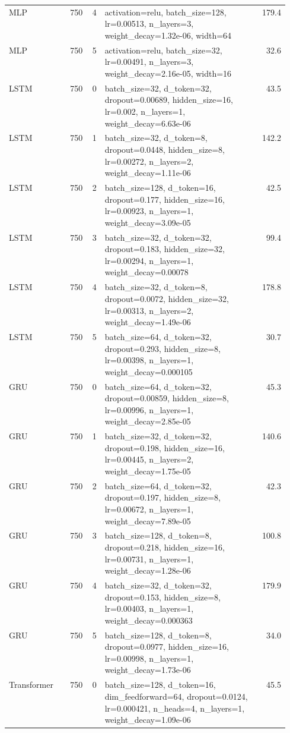 \begin{longtable}{lrrp{0.55\linewidth}r}
MLP & 750 & 4 & activation=relu, batch\_size=128, lr=0.00513, n\_layers=3, weight\_decay=1.32e-06, width=64 & 179.4 \\
MLP & 750 & 5 & activation=relu, batch\_size=32, lr=0.00491, n\_layers=3, weight\_decay=2.16e-05, width=16 & 32.6 \\
LSTM & 750 & 0 & batch\_size=32, d\_token=32, dropout=0.00689, hidden\_size=16, lr=0.002, n\_layers=1, weight\_decay=6.63e-06 & 43.5 \\
LSTM & 750 & 1 & batch\_size=32, d\_token=8, dropout=0.0448, hidden\_size=8, lr=0.00272, n\_layers=2, weight\_decay=1.11e-06 & 142.2 \\
LSTM & 750 & 2 & batch\_size=128, d\_token=16, dropout=0.177, hidden\_size=16, lr=0.00923, n\_layers=1, weight\_decay=3.09e-05 & 42.5 \\
LSTM & 750 & 3 & batch\_size=32, d\_token=32, dropout=0.183, hidden\_size=32, lr=0.00294, n\_layers=1, weight\_decay=0.00078 & 99.4 \\
LSTM & 750 & 4 & batch\_size=32, d\_token=8, dropout=0.0072, hidden\_size=32, lr=0.00313, n\_layers=2, weight\_decay=1.49e-06 & 178.8 \\
LSTM & 750 & 5 & batch\_size=64, d\_token=32, dropout=0.293, hidden\_size=8, lr=0.00398, n\_layers=1, weight\_decay=0.000105 & 30.7 \\
GRU & 750 & 0 & batch\_size=64, d\_token=32, dropout=0.00859, hidden\_size=8, lr=0.00996, n\_layers=1, weight\_decay=2.85e-05 & 45.3 \\
GRU & 750 & 1 & batch\_size=32, d\_token=32, dropout=0.198, hidden\_size=16, lr=0.00445, n\_layers=2, weight\_decay=1.75e-05 & 140.6 \\
GRU & 750 & 2 & batch\_size=64, d\_token=32, dropout=0.197, hidden\_size=8, lr=0.00672, n\_layers=1, weight\_decay=7.89e-05 & 42.3 \\
GRU & 750 & 3 & batch\_size=128, d\_token=8, dropout=0.218, hidden\_size=16, lr=0.00731, n\_layers=1, weight\_decay=1.28e-06 & 100.8 \\
GRU & 750 & 4 & batch\_size=32, d\_token=32, dropout=0.153, hidden\_size=8, lr=0.00403, n\_layers=1, weight\_decay=0.000363 & 179.9 \\
GRU & 750 & 5 & batch\_size=128, d\_token=8, dropout=0.0977, hidden\_size=16, lr=0.00998, n\_layers=1, weight\_decay=1.73e-06 & 34.0 \\
Transformer & 750 & 0 & batch\_size=128, d\_token=16, dim\_feedforward=64, dropout=0.0124, lr=0.000421, n\_heads=4, n\_layers=1, weight\_decay=1.09e-06 & 45.5 \\

\end{longtable}

